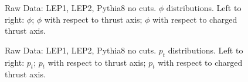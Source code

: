 \begin{figure}[H]
\centering
{}\hfill
{}\hfill
{}\hfill
\caption{Raw Data: LEP1, LEP2, Pythia8 no cuts. $\phi$ distributions. Left to right: $\phi$; $\phi$ with respect to thrust axis; $\phi$ with respect to charged thrust axis.}
\end{figure}

\begin{figure}[H]
\centering
{}\hfill
{}\hfill
{}\hfill
\caption{Raw Data: LEP1, LEP2, Pythia8 no cuts. $p_t$ distributions. Left to right: $p_t$; $p_t$ with respect to thrust axis; $p_t$ with respect to charged thrust axis.}
\end{figure}

